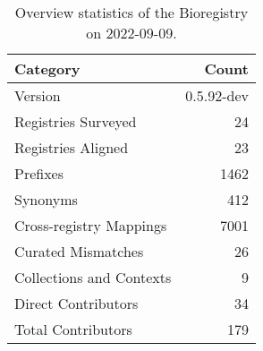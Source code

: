 \begin{table}
\centering
\caption{Overview statistics of the Bioregistry on 2022-09-09.}
\label{tab:bioregistry-summary}
\begin{tabular}{lr}
\toprule
                Category &      Count \\
\midrule
                 Version & 0.5.92-dev \\
     Registries Surveyed &         24 \\
      Registries Aligned &         23 \\
                Prefixes &       1462 \\
                Synonyms &        412 \\
 Cross-registry Mappings &       7001 \\
      Curated Mismatches &         26 \\
Collections and Contexts &          9 \\
     Direct Contributors &         34 \\
      Total Contributors &        179 \\
\bottomrule
\end{tabular}
\end{table}
